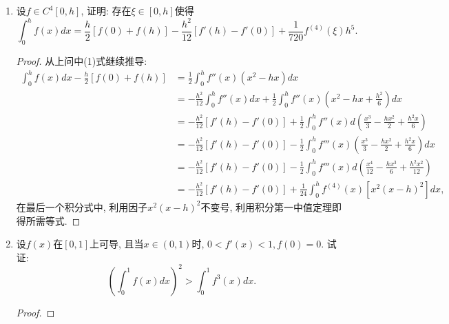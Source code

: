 \documentclass[UTF8,11pt, a4paper, oneside, fontset=none]{ctexbook}
\begin{document}
\begin{enumerate}
\begin{proof}


作两次分部积分得:
\[
\int_0^h f(x) dx = \int_0^h f(x) d \left( x - \frac{h}{2} \right) = f(x) \left( x - \frac{h}{2} \right)\Big|_0^h - \int_0^h f'(x)  \left( x - \frac{h}{2} \right)dx
\]
\[
= \frac{h}{2} [f(0) + f(h)] - \frac{1}{2} \int_0^h f'(x) d (x^2 - hx)  = \frac{h}{2} [f(0) + f(h)] + \frac{1}{2} \int_0^h f''(x) (x^2 - hx) dx. \eqno{(1)}
\]
由于$x^2 - hx$不变号, 对右边的积分用第一中值定理得
\[
\frac{1}{2} \int_0^h f''(x) (x^2 - hx)  dx = \frac{1}{2} f''(\xi) \int_0^h (x^2 - hx)  dx = - \frac{1}{12} f''(\xi) h^3.
\]
也可以用微积分基本定理证明.
\end{proof}


\item 设$f \in C^4[0, h]$, 证明: 存在$\xi \in [0, h]$使得
\[
\int_0^h f(x) dx = \frac{h}{2} [f(0) + f(h)] - \frac{h^2}{12} [f'(h) - f'(0)] + \frac{1}{720} f^{(4)} (\xi) h^5.
\]

\begin{proof}

从上问中(1)式继续推导:
\begin{align*}
\int_0^h f(x) dx - \frac{h}{2} [f(0) + f(h)] & = \frac{1}{2} \int_0^h f''(x)(x^2 - hx) dx \\
& = - \frac{h^2}{12} \int_0^h f''(x) dx + \frac{1}{2} \int_0^h f''(x) \left(x^2 - hx + \frac{h^2}{6} \right) dx \\
& = - \frac{h^2}{12} [f'(h) - f'(0)] + \frac{1}{2} \int_0^h f''(x) d \left(\frac{x^3}{3} - \frac{hx^2}{2} + \frac{h^2x}{6} \right) \\
& =  - \frac{h^2}{12} [f'(h) - f'(0)] - \frac{1}{2} \int_0^h f'''(x) \left(\frac{x^3}{3} - \frac{hx^2}{2} + \frac{h^2x}{6} \right) dx \\
& = - \frac{h^2}{12} [f'(h) - f'(0)] - \frac{1}{2} \int_0^h f'''(x) d \left(\frac{x^4}{12} - \frac{hx^3}{6} + \frac{h^2x^2}{12} \right) \\
& = - \frac{h^2}{12} [f'(h) - f'(0)] + \frac{1}{24} \int_0^h f^{(4)} (x) [x^2 (x-h)^2] dx,
\end{align*}
在最后一个积分式中, 利用因子$x^2(x - h)^2$不变号, 利用积分第一中值定理即得所需等式.


\end{proof}


\item 设$f(x)$在$[0, 1]$上可导, 且当$x \in (0, 1)$时, $0 < f'(x) < 1, f(0) = 0$. 试证:
\[
\left( \int_0^1 f(x) dx \right)^2 > \int_0^1 f^3(x) dx.
\]

\begin{proof}


\end{proof}
\end{enumerate}
\end{document}
